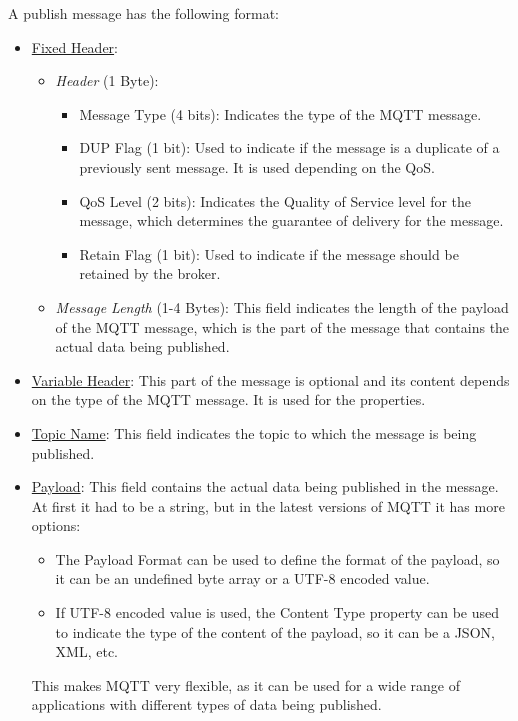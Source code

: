 \begin{itemize}
    A publish message has the following format:
    \begin{itemize}
        \item \ul{Fixed Header}:
        \begin{itemize}
            \item \emph{Header} (1 Byte):
            \begin{itemize}
                \item Message Type (4 bits): Indicates the type of the MQTT message.
                \item DUP Flag (1 bit): Used to indicate if the message is a duplicate of a previously sent message. It is used depending on the QoS.
                \item QoS Level (2 bits): Indicates the Quality of Service level for the message, which determines the guarantee of delivery for the message.
                \item Retain Flag (1 bit): Used to indicate if the message should be retained by the broker.
            \end{itemize}
            \item \emph{Message Length} (1-4 Bytes): This field indicates the length of the payload of the MQTT message, which is the part of the message that contains the actual data being published.
        \end{itemize}
        \item \ul{Variable Header}: This part of the message is optional and its content depends on the type of the MQTT message. It is used for the properties.
        \item \ul{Topic Name}: This field indicates the topic to which the message is being published.
        \item \ul{Payload}: This field contains the actual data being published in the message. At first it had to be a string, but in the latest versions of MQTT it has more options:
        \begin{itemize}
            \item The Payload Format can be used to define the format of the payload, so it can be an undefined byte array or a UTF-8 encoded value.
            \item If UTF-8 encoded value is used, the Content Type property can be used to indicate the type of the content of the payload, so it can be a JSON, XML, etc.
        \end{itemize}
        This makes MQTT very flexible, as it can be used for a wide range of applications with different types of data being published.
    \end{itemize}
\end{itemize}


